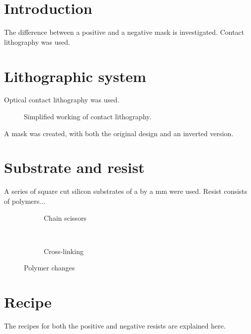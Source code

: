 \section*{Introduction}
The difference between a positive and a negative mask is investigated. Contact lithography was used.

\section*{Lithographic system}
Optical contact lithography was used.
\begin{figure}[H]
	\centering
	\resizebox{0.7\linewidth}{!}{}
	\caption{Simplified working of contact lithography.}
	\label{fig:contact-litho}
\end{figure}
A mask was created, with both the original design and an inverted version.

\section*{Substrate and resist}
A series of square cut silicon substrates of a by a mm  were used. Resist consists of polymers...

\begin{figure}[H]
	\centering
	\begin{subfigure}[t]{0.45\linewidth}
		\centering
		\resizebox{\linewidth}{!}{}
		\caption{Chain scissors}
		\label{fig:chainscissor}
	\end{subfigure}
	~
	\begin{subfigure}[t]{0.45\linewidth}
		\centering
		\resizebox{\linewidth}{!}{}
		\caption{Cross-linking}
		\label{fig:crosslinking}
	\end{subfigure}
	\caption{Polymer changes}
	\label{fig:polymers}
\end{figure}


\section*{Recipe}
The recipes for both the positive and negative resists are explained here.
